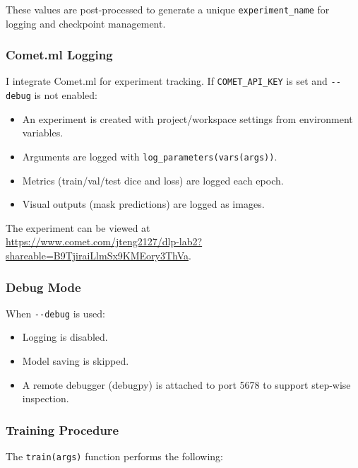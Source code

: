 \documentclass{homework}
\begin{document}
These values are post-processed to generate a unique \lstinline{experiment_name} for logging and checkpoint management.

\subsubsection{Comet.ml Logging}
I integrate Comet.ml for experiment tracking. If \lstinline{COMET_API_KEY} is set and \lstinline{--debug} is not enabled:

\begin{itemize}
    \item An experiment is created with project/workspace settings from environment variables.
    \item Arguments are logged with \lstinline{log_parameters(vars(args))}.
    \item Metrics (train/val/test dice and loss) are logged each epoch.
    \item Visual outputs (mask predictions) are logged as images.
\end{itemize}

The experiment can be viewed at \\
\url{https://www.comet.com/jteng2127/dlp-lab2?shareable=B9TjiraiLlmSx9KMEory3ThVa}.

\subsubsection{Debug Mode}
When \lstinline{--debug} is used:

\begin{itemize}
    \item Logging is disabled.
    \item Model saving is skipped.
    \item A remote debugger (debugpy) is attached to port 5678 to support step-wise inspection.
\end{itemize}

\subsubsection{Training Procedure}
The \lstinline{train(args)} function performs the following:
\end{document}
